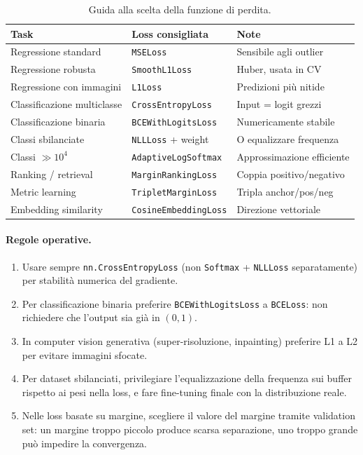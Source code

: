 \begin{table}[H]
  \centering
  \caption{Guida alla scelta della funzione di perdita.}
  \label{tab:loss_guide}
  \small
  \begin{tabularx}{\linewidth}{l l X}
    \toprule
    \textbf{Task} & \textbf{Loss consigliata} & \textbf{Note} \\
    \midrule
    Regressione standard        & \texttt{MSELoss}             & Sensibile agli outlier \\
    Regressione robusta         & \texttt{SmoothL1Loss}        & Huber, usata in CV \\
    Regressione con immagini    & \texttt{L1Loss}              & Predizioni più nitide \\
    Classificazione multiclasse & \texttt{CrossEntropyLoss}    & Input = logit grezzi \\
    Classificazione binaria     & \texttt{BCEWithLogitsLoss}   & Numericamente stabile \\
    Classi sbilanciate          & \texttt{NLLLoss} + weight    & O equalizzare frequenza \\
    Classi $\gg 10^4$           & \texttt{AdaptiveLogSoftmax}  & Approssimazione efficiente \\
    Ranking / retrieval         & \texttt{MarginRankingLoss}   & Coppia positivo/negativo \\
    Metric learning             & \texttt{TripletMarginLoss}   & Tripla anchor/pos/neg \\
    Embedding similarity        & \texttt{CosineEmbeddingLoss} & Direzione vettoriale \\
    \bottomrule
  \end{tabularx}
\end{table}

\paragraph{Regole operative.}
\begin{enumerate}
  \item Usare sempre \texttt{nn.CrossEntropyLoss} (non \texttt{Softmax} +
        \texttt{NLLLoss} separatamente) per stabilità numerica del gradiente.
  \item Per classificazione binaria preferire \texttt{BCEWithLogitsLoss}
        a \texttt{BCELoss}: non richiedere che l'output sia già in $(0,1)$.
  \item In computer vision generativa (super-risoluzione, inpainting) preferire
        L1 a L2 per evitare immagini sfocate.
  \item Per dataset sbilanciati, privilegiare l'equalizzazione della frequenza
        sui buffer rispetto ai pesi nella loss, e fare fine-tuning finale con la
        distribuzione reale.
  \item Nelle loss basate su margine, scegliere il valore del margine tramite
        validation set: un margine troppo piccolo produce scarsa separazione, uno
        troppo grande può impedire la convergenza.
\end{enumerate}


